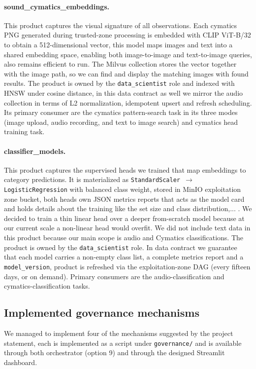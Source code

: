\documentclass[11pt,a4paper]{article}
\begin{document}
\paragraph{sound\_cymatics\_embeddings.} This product captures the visual signature of all observations. Each cymatics PNG generated during trusted-zone processing is embedded with CLIP ViT-B/32 to obtain a 512-dimensional vector, this model maps images and text into a shared embedding space, enabling both image-to-image and text-to-image queries, also remains efficient to run. The Milvus collection stores the vector together with the image path, so we can find and display the matching images with found results. The product is owned by the \texttt{data\_scientist} role and indexed with HNSW under cosine distance, in this data contract as well we mirror the audio collection in terms of L2 normalization, idempotent upsert and refresh scheduling. Its primary consumer are the cymatics pattern-search task in its three modes (image upload, audio recording, and text to image search) and cymatics head training task.

\newpage

\paragraph{classifier\_models.} This product captures the supervised heads we trained that map embeddings to category predictions. It is materialized as \texttt{StandardScaler $\rightarrow$ LogisticRegression} with balanced class weight, stored in MinIO exploitation zone bucket, both heads own JSON metrics reports that acts as the model card and holds details about the training like the set size and class distribution,... . We decided to train a thin linear head over a deeper from-scratch model because at our current scale a non-linear head would overfit. We did not include text data in this product because our main scope is audio and Cymatics classifications. The product is owned by the \texttt{data\_scientist} role. In data contract we guarantee that each model carries a non-empty class list, a complete metrics report and a \texttt{model\_version}, product is refreshed via the exploitation-zone DAG (every fifteen days, or on demand). Primary consumers are the audio-classification and cymatics-classification tasks.




\subsection{Implemented governance mechanisms}
We managed to implement four of the mechanisms suggested by the project statement, each is implemented as a script under \texttt{governance/} and is available through both orchestrator (option 9) and through the designed Streamlit dashboard.
\end{document}
